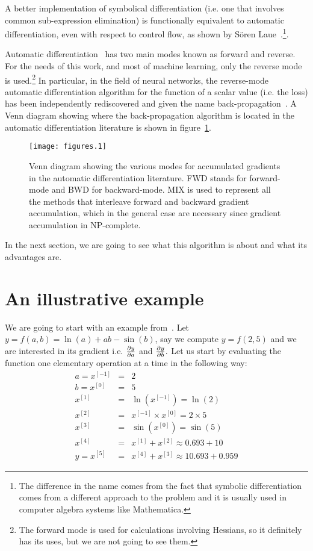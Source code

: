 \documentclass{sapthesis}
\begin{document}
A better implementation of symbolical differentiation (i.e. one that involves
common sub-expression elimination) is functionally equivalent to automatic
differentiation, even with respect to control flow, as shown by S\"oren
Laue~\cite{laue2019}.\footnote{The difference in the name comes from the fact
that symbolic differentiation comes from a different approach to the problem and
it is usually used in computer algebra systems like Mathematica.}.

Automatic differentiation~\cite{baydin2017} has two main modes known as forward
and reverse. For the needs of this work, and most of machine learning, only the
reverse mode is used.\footnote{The forward mode is used for calculations
involving Hessians, so it definitely has its uses, but we are not going to see
them.} In particular, in the field of neural networks, the reverse-mode
automatic differentiation algorithm for the function of a scalar value (i.e. the
loss) has been independently rediscovered and given the name
back-propagation~\cite{rumelhart1986}. A Venn diagram showing where the
back-propagation algorithm is located in the automatic differentiation
literature is shown in figure~\ref{fig:ad-venn}.

\begin{figure}
\centering
\texttt{[image: figures.1]}
\caption{Venn diagram showing the various modes for accumulated gradients in the
automatic differentiation literature. FWD stands for forward-mode and BWD for
backward-mode. MIX is used to represent all the methods that interleave forward
and backward gradient accumulation, which in the general case are necessary since
gradient accumulation in NP-complete.}
\label{fig:ad-venn}
\end{figure}

In the next section, we are going to see what this algorithm is about and what
its advantages are.

\section{An illustrative example}

We are going to start with an example from~\cite{baydin2017}. Let \(y = f(a,b) =
\ln(a) + a b - \sin(b)\), say we compute \(y = f(2,5)\) and we are interested in
its gradient i.e. \(\textstyle\frac{\partial y}{\partial a}\) and \(\textstyle\frac{\partial y}{\partial b}.\) Let us start by
evaluating the function one elementary operation at a time in the following way:
\begin{eqnarray*}
a = x^{[-1]} &=& 2 \\
b = x^{[0]}  &=& 5 \\
    x^{[1]}  &=& \ln\left(x^{[-1]}\right) = \ln(2) \\
    x^{[2]}  &=& x^{[-1]} \times x^{[0]} = 2 \times 5 \\
    x^{[3]}  &=& \sin\left(x^{[0]}\right) = \sin(5) \\
    x^{[4]}  &=& x^{[1]} + x^{[2]} \approx 0.693 + 10 \\
y = x^{[5]}  &=& x^{[4]} + x^{[3]} \approx 10.693 + 0.959
\end{eqnarray*}
\end{document}
